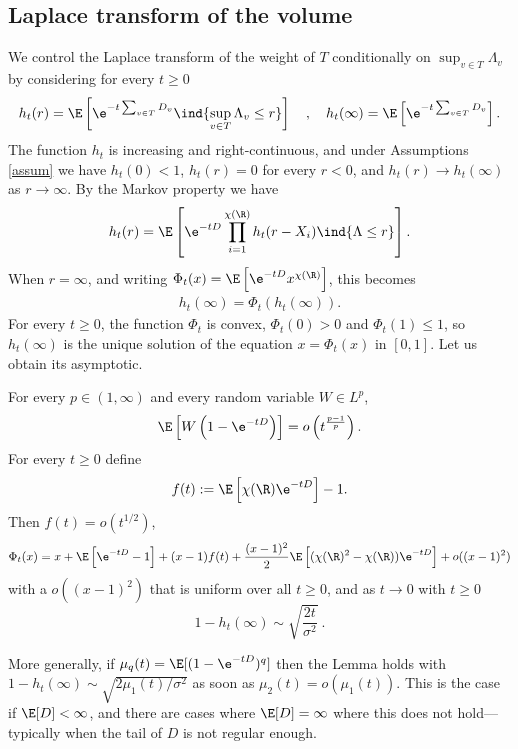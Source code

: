 \documentclass[10pt,a4paper]{article}
\newcommand{\todo}[1]{\textcolor{blue}{\textbf{TODO:} #1}}
\begin{document}
\subsection{Laplace transform of the volume}
\label{sec:2Laplace-volume-without-displacement}


We control the Laplace transform of the weight of $T$ conditionally on $\sup_{v\in T} \Lambda_v$ by considering for every $t\geq 0$
\[h_t(r) = \E\left[ \e^{-t \sum_{v\in T} D_v} \ind{\sup_{v\in T} \Lambda_v \leq r}\right] \quad , \quad h_t(\infty) = \E\left[ \e^{-t \sum_{v\in T} D_v}\right] . \]
The function $h_t$ is increasing and right-continuous, and under Assumptions \ref{assum} we have $h_t(0)<1$, $h_t(r)=0$ for every $r<0$, and $h_t(r)\to h_t(\infty)$ as $r\to\infty$. By the Markov property we have
\begin{equation}\label{eq:2convolution-equation-1}
h_t(r) = \E\left[ \e^{-t D} \prod_{i=1}^{\chi(\R)} h_t(r-X_i) \ind{\Lambda\leq r} \right] .
\end{equation}
When $r=\infty$, and writing $\Phi_t(x) = \E\left[\e^{-tD} x^{\chi(\R)}\right]$, this becomes 
\begin{align}\label{eq:2htinf-point-fixe}
h_t(\infty) = \Phi_t(h_t(\infty)) .
\end{align}
For every $t\geq 0$, the function $\Phi_t$ is convex, $\Phi_t(0)>0$ and $\Phi_t(1)\leq 1$, so $h_t(\infty)$ is the unique solution of the equation $x = \Phi_t(x)$ in $[0,1]$. Let us obtain its asymptotic. 

\begin{lemma}\label{lem:phit-taylor-expansion}
For every $p \in (1,\infty)$ and every random variable $W\in L^p$,
\[ \E\left[W \left(1 - \e^{-tD}\right)\right] = o\left(t^{\frac{p-1}{p}}\right) . \] 
For every $t\geq 0$ define
\[ f(t) := \E\left[\chi(\R) \e^{-tD}\right] -1 . \] 
Then $f(t) = o(t^{1/2})$, 
\begin{equation}\label{eq:phit-taylor-expansion}
\Phi_t(x) = x + \E\left[ \e^{-tD}-1 \right] + (x-1)f(t) + \frac{(x-1)^2}{2} \E\left[ (\chi(\R)^2 - \chi(\R))\e^{-t D} \right] + o((x-1)^2)
\end{equation} 
with a $o((x-1)^2)$ that is uniform over all $t\geq 0$, and as $t\to 0$ with $t\geq 0$
\begin{equation}\label{eq:htinfty-taylor-expansion}
1-h_t(\infty) \sim \sqrt{\frac{2 t}{\sigma^2}} \ .
\end{equation}
\end{lemma}


\begin{remark}
More generally, if $\mu_q(t) = \E[(1-\e^{-tD})^q ]$ then the Lemma holds with $1-h_t(\infty)\sim\sqrt{2\mu_1(t)/\sigma^2}$ as soon as $\mu_2(t) = o(\mu_1(t))$. This is the case if $\E[D]<\infty$, and there are cases where $\E[D]=\infty$ where this does not hold---typically when the tail of $D$ is not regular enough. %
\end{remark}
\end{document}

